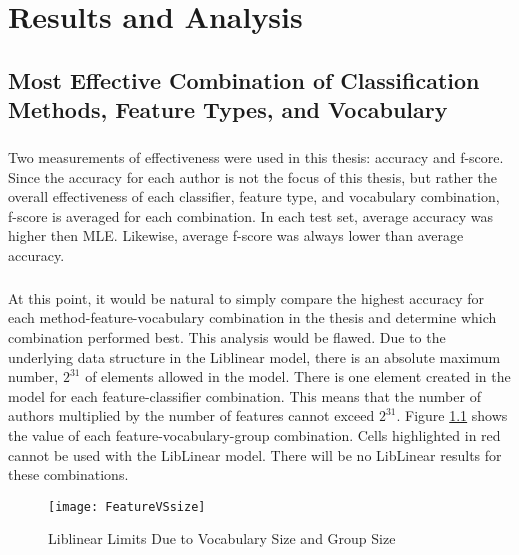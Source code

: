 \chapter{Results and Analysis}

\section{Most Effective Combination of Classification Methods, Feature Types, and Vocabulary}
	\paragraph*{} Two measurements of effectiveness were used in this thesis: accuracy and f-score.  Since the accuracy for each author is not the focus of this thesis, but rather the overall effectiveness of each classifier, feature type, and vocabulary combination, f-score is averaged for each combination.  In each test set, average accuracy was higher then MLE.  Likewise, average f-score was always lower than average accuracy.

	\paragraph*{} At this point, it would be natural to simply compare the highest accuracy for each method-feature-vocabulary combination in the thesis and determine which combination performed best.  This analysis would be flawed.  Due to the underlying data structure in the Liblinear model, there is an absolute maximum number, $2^{31}$ of elements allowed in the model.  There is one element created in the model for each feature-classifier combination.  This means that the number of authors multiplied by the number of features cannot exceed $2^{31}$.  Figure \ref{fig:FeatureVSsize} shows the value of each feature-vocabulary-group combination.  Cells highlighted in red cannot be used with the LibLinear model.  There will be no LibLinear results for these combinations.  
	

\begin{figure}[htbp!]
	\begin{center}
	\centering
	\texttt{[image: FeatureVSsize]}
	\caption{Liblinear Limits Due to Vocabulary Size and Group Size}
	\label{fig:FeatureVSsize}
	\end{center}
\end{figure}


